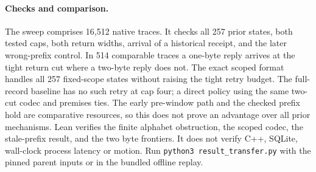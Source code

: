 \documentclass{article}
\begin{document}
\paragraph{Checks and comparison.}
The sweep comprises 16,512 native traces. It checks all 257
prior states, both tested caps, both return widths, arrival of a
historical receipt, and the later wrong-prefix control.
In 514 comparable traces a one-byte reply arrives at the tight
return cut where a two-byte reply does not. The exact scoped
format handles all 257 fixed-scope states without raising the
tight retry budget. The full-record baseline has no such
retry at cap four; a direct policy using the same two-cut codec
and premises ties. The early pre-window path and the checked
prefix hold are comparative resources, so this does not prove an
advantage over all prior mechanisms. Lean verifies the finite
alphabet obstruction, the scoped codec, the stale-prefix result,
and the two byte frontiers. It does not verify C++, SQLite,
wall-clock process latency or motion. Run
\texttt{python3 result\_transfer.py} with the pinned parent inputs
or in the bundled offline replay.
\end{document}
